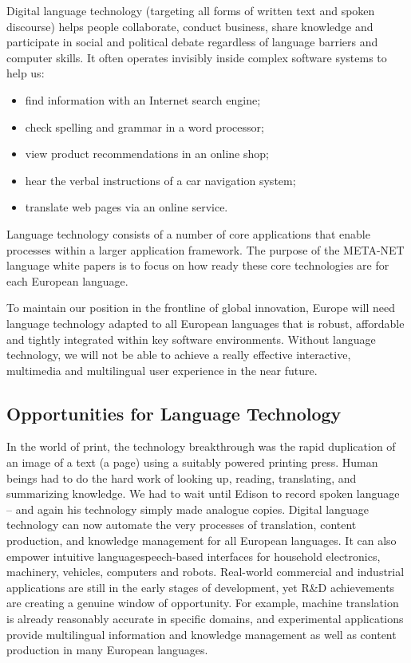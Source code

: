 \begin{multicols}{2}
    Digital language technology (targeting all forms of written text and spoken discourse) helps people collaborate, conduct business, share knowledge and participate in social and political debate regardless of language barriers and computer skills. It often operates invisibly inside complex software systems to help us:
    \begin{itemize}
      \item find information with an Internet search engine;
      \item check spelling and grammar in a word processor;
      \item view product recommendations in an online shop;
      \item hear the verbal instructions of a car navigation system;
      \item translate web pages via an online service.
    \end{itemize}
    Language technology consists of a number of core applications that enable processes within a larger application framework. The purpose of the META-NET language white papers is to focus on how ready these core technologies are for each European language. 
    

    To maintain our position in the frontline of global innovation, Europe will need language technology adapted to all European languages that is robust, affordable and tightly integrated within key software environments. Without language technology, we will not be able to achieve a really effective interactive, multimedia and multilingual user experience in the near future.

\subsection{Opportunities for Language Technology}
    In the world of print, the technology breakthrough was the rapid duplication of an image of a text (a page) using a suitably powered printing press. Human beings had to do the hard work of looking up, reading, translating, and summarizing knowledge. We had to wait until Edison to record spoken language – and again his technology simply made analogue copies.
    Digital language technology can now automate the very processes of translation, content production, and knowledge management for all European languages. It can also empower intuitive language\/speech-based interfaces for household electronics, machinery, vehicles, computers and robots. Real-world commercial and industrial applications are still in the early stages of development, yet R\&D achievements are creating a genuine window of opportunity. For example, machine translation is already reasonably accurate in specific domains, and experimental applications provide multilingual information and knowledge management as well as content production in many European languages. 


\end{multicols}
